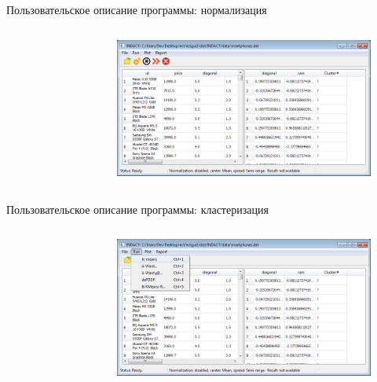\documentclass[aspectratio=169,tikz]{beamer}
\begin{document}
	\begin{frame}{Пользовательское описание программы: нормализация}
	\begin{columns}
		\begin{figure}[T] %
			\centering
			
		\end{figure}
		\begin{figure}[T] %
			\centering
			\includegraphics[width=0.95\linewidth]{img/diploma/instruction/norm-result-prez}
		\end{figure}
	\end{columns}
	\end{frame}	


	\begin{frame}{Пользовательское описание программы: кластеризация}
	\begin{columns}
		\column{0.2\linewidth}
		\begin{figure}[T] %
			\centering
			
		\end{figure}
		\column{0.8\linewidth}
		\begin{figure}[T] %
			\centering
			\includegraphics[width=0.95\linewidth]{img/diploma/instruction/run-clustering-prez}
		\end{figure}
	\end{columns}
	\end{frame}	
\end{document}
